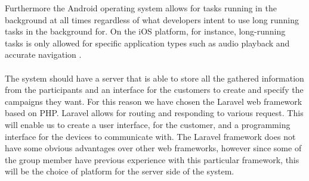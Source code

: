 Furthermore the Android operating system allows for tasks running in the background at all times regardless of what developers intent to use long running tasks in the background for. On the iOS platform, for instance, long-running tasks is only allowed for specific application types such as audio playback and accurate navigation \parencite{apple_long_running_task}.
\\\\
The system should have a server that is able to store all the gathered information from the participants and an interface for the customers to create and specify the campaigns they want. For this reason we have chosen the Laravel web framework based on PHP. Laravel allows for routing and responding to various request. This will enable us to create a user interface, for the customer, and a programming interface for the devices to communicate with. The Laravel framework does not have some obvious advantages over other web frameworks, however since some of the group member have previous experience with this particular framework, this will be the choice of platform for the server side of the system.



